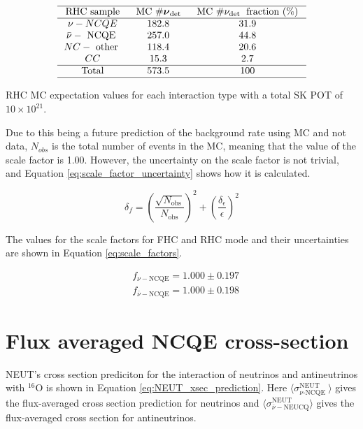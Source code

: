 \begin{table}
    $$
    \begin{array}{ccc}
    \hline \text { RHC sample } & \text { MC } \# \boldsymbol{\nu}_{\text {det }} & \text { MC } \# \nu_{\text {det }} \text { fraction (\%) } \\
    \hline \nu-N C Q E & 182.8 & 31.9 \\
    \bar{\nu}-\text { NCQE } & 257.0 & 44.8 \\
    N C-\text { other } & 118.4 & 20.6 \\
    C C & 15.3 & 2.7 \\
    \hline \text { Total } & 573.5 & 100 \\
    \hline
    \end{array}
    $$
    \caption{RHC MC expectation values for each interaction type with a total SK POT of $10 \times 10^{21}$.}
    \label{table:nu_RHC_mc}
\end{table}

Due to this being a future prediction of the background rate using MC and not data, $N_{obs}$ is the total number of events in the MC, meaning that the value of the scale factor is 1.00. However, the uncertainty on the scale factor is not trivial, and Equation \ref{eq:scale_factor_uncertainty} shows how it is calculated.

\begin{equation}
    \delta_{f} = \left({\frac{\sqrt{N_{\text{obs}}}}{N_{\text{obs}}}}\right)^{2} + \left({\frac{\delta_{\epsilon}}{\epsilon}}\right)^{2}
\label{eq:scale_factor_uncertainty}
\end{equation}

The values for the scale factors for FHC and RHC mode and their uncertainties are shown in Equation \ref{eq:scale_factors}.


\begin{equation}
    \begin{aligned}
    & f_{\nu-\mathrm{NCQE}}= 1.000 \pm 0.197 \\
    & f_{\bar{\nu}-\mathrm{NCQE}}=1.000 \pm 0.198
    \label{eq:scale_factors}
    \end{aligned}
\end{equation}


\section{Flux averaged NCQE cross-section}

NEUT's cross section prediciton for the interaction of neutrinos and antineutrinos with ${ }^{16} \mathrm{O}$ is shown in Equation \ref{eq:NEUT_xsec_prediction}. Here $\langle\sigma_{\nu \text {-NCQE }}^{\text {NEUT }}\rangle$ gives the flux-averaged cross section prediction for neutrinos and $\langle\sigma_{\bar{\nu}-\mathrm{NEUCQ}}^{\mathrm{NEUT}}\rangle$ gives the flux-averaged cross section for antineutrinos. 


